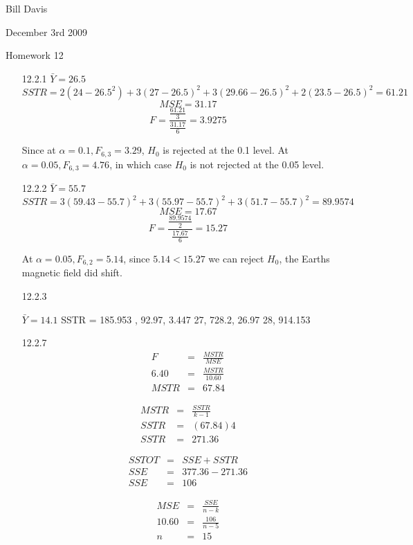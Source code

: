 \documentclass[11pt,fleqn]{article}
\begin{document}
\newcommand{\mbf}[1]{\mbox{{\bfseries #1}}}
\newcommand{\N}{\mbf{N}}
\renewcommand{\O}{\mbf{O}}
\newcommand{\tabfrac}[2]{%
	\setlength{\fboxrule}{0pt}%
	\fbox{$\frac{#1}{#2}$}%
}

\noindent Bill Davis 

\noindent December 3rd 2009 

\noindent Homework 12

\begin{enumerate}
  \item[12.2.1]
 $\bar{Y} = 26.5$
 \[
 SSTR = 2(24-26.5^2) + 3(27-26.5)^2 + 3(29.66-26.5)^2 + 2(23.5-26.5)^2 = 61.21 
 \]
 \[
 MSE = 31.17
 \]
 \[
 F = \frac{\frac{61.21}{3}}{\frac{31.17}{6}} = 3.9275
 \]
 
 Since at $\alpha=0.1, F_{6,3} = 3.29$, $H_0$ is rejected at the 0.1 level.
 At $\alpha=0.05, F_{6,3} = 4.76$, in which case $H_0$ is not rejected at the
 0.05 level. 
  \item[12.2.2]
  $\bar{Y} = 55.7$
  \[
  SSTR = 3(59.43-55.7)^2 + 3(55.97-55.7)^2 + 3(51.7-55.7)^2 = 89.9574
  \]
  \[
  MSE = 17.67
  \]
  \[
  F = \frac{\frac{89.9574}{2}}{\frac{17.67}{6}} = 15.27
  \]
  
  At $\alpha = 0.05, F_{6,2} = 5.14$, since $5.14<15.27$ we can reject $H_0$,
  the Earths magnetic field did shift. 
  \item[12.2.3]
  
 $\bar{Y} = 14.1$
 SSTR = 185.953 , 92.97, 3.447 
 27, 728.2, 26.97
 28, 914.153
 
  \item[12.2.7]
  \begin{eqnarray}
  F &=& \frac{MSTR}{MSE}  \\
  6.40 &=& \frac{MSTR}{10.60} \\
  MSTR &=& 67.84
  \end{eqnarray}

	\begin{eqnarray}
	MSTR &=& \frac{SSTR}{k-1} \\
	SSTR &=& (67.84){4} \\
	SSTR &=&  271.36
 	\end{eqnarray}

	\begin{eqnarray}
	SSTOT &=& SSE + SSTR \\
	SSE &=& 377.36 - 271.36 \\
	SSE &=& 106
	\end{eqnarray}

	\begin{eqnarray}
    MSE &=& \frac{SSE}{n-k} \\
    10.60 &=& \frac{106}{n-5} \\
    n &=& 15
    \end{eqnarray}


\end{enumerate}
\end{document}
